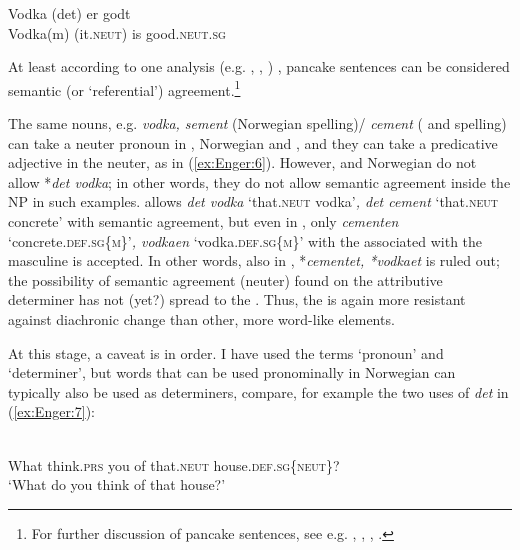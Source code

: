 \documentclass[output=paper]{langsci/langscibook}
\begin{document}
\begin{exe}
\begin{xlist}
\begin{xlist}
\ea\label{ex:Enger:6} \gll Vodka (det) er godt \\
Vodka(m) (it.\textsc{neut}) is good.\textsc{neut}.\textsc{sg}\\
\z

At least according to one analysis %
(e.g. \citealt{Enger2004c}, \citealt{Wechsler13}, \citealt{Haugen17})%
%
, pancake sentences can be considered
semantic (or `referential') agreement.\footnote{For further discussion
  of pancake sentences, see e.g. %
\citet{Corbett16}%
%
, 
 \citet{Enger13}, 
\citet{Josefsson09,Josefsson14b}%
%
, %
\citet{Haugen14}%
%
.}

The same nouns, e.g. \emph{vodka, sement} (Norwegian spelling)/
\emph{cement} ( and  spelling) can take a neuter pronoun in
, Norwegian and , and they can take a predicative adjective
in the neuter, as in (\ref{ex:Enger:6}). However,  and Norwegian do not
allow *\emph{det vodka}; in other words, they do not allow semantic
agreement inside the NP in such examples.  allows \emph{det vodka}
`that.\textsc{neut} vodka'\emph{, det cement} `that.\textsc{neut} concrete' with semantic
agreement, but even in , only \emph{cementen}
`concrete.\textsc{def}.\textsc{sg}\{\textsc{m}\}'\emph{, vodkaen} `vodka.\textsc{def}.\textsc{sg}\{\textsc{m}\}' with the
 associated with the masculine is accepted. In other words, also
in , *\emph{cementet, *vodkaet} is ruled out; the possibility of
semantic agreement (neuter) found on the attributive determiner has not
(yet?) spread to the . Thus, the  is again more resistant
against diachronic change than other, more word-like elements.

At this stage, a caveat is in order. I have used the terms `pronoun' and
`determiner', but words that can be used pronominally in Norwegian can
typically also be used as determiners, compare, for example the two uses
of \emph{det} in (\ref{ex:Enger:7}):

\ea\label{ex:Enger:7}
\ea\label{ex:Enger:7a} \\
What think.\textsc{prs} you of that.\textsc{neut} house.\textsc{def}.\textsc{sg}\{\textsc{neut}\}?\\
\glt `What do you think of that house?'\\


\end{xlist}
\end{xlist}
\end{exe}
\end{document}
